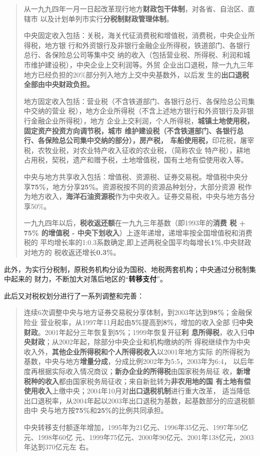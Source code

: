 \begin{quotation}
  从一九九四年一月一日起改革现行地方\textbf{财政包干体制}，对各省、自治区、直辖市
  以及计划单列市实行\textbf{分税制财政管理体制}。

  中央固定收入包括：关税，海关代征消费税和增值税，消费税，中央企业所得税，地方银
  行和外资银行及非银行金融企业所得税，铁道部门、各银行总行、各保险总公司等集中交
  纳的收入（包括营业税、所得税、利润和城市维护建设税），中央企业上交利润等。外贸
  企业出口退税，除一九九三年地方已经负担的20\%部分列入地方上交中央基数外，以后发
  生的\textbf{出口退税全部由中央财政负担。}

  地方固定收入包括：营业税（不含铁道部门、各银行总行、各保险总公司集中交纳的营业
  税），地方企业所得税（不含上述地方银行和外资银行及非银行金融企业所得税），地方
  企业上交利润，个人所得税，\textbf{城镇土地使用税，固定资产投资方向调节税，城市
    维护建设税（不含铁道部门、各银行总行、各保险总公司集中交纳的部分），房产税，
    车船使用税，}印花税，屠宰税，农牧业税，对农业特产收入征收的农业税，（简称农业
  特产税），耕地占用税，契税，遗产和赠予税，土地增值税，国有土地有偿使用收入等。

  中央与地方共享收入包括：增值税、资源税、证券交易税。增值税中央分
  享\textbf{75\%}，地方分享\textbf{25\%}。资源税按不同的资源品种划分，大部分资源
  税作为地方收入，\textbf{海洋石油资源税}作为中央收入。证券交易税，中央与地方各分
  享50\%。

  一九九四年以后，\textbf{税收返还额}在一九九三年基数（即1993年的\textbf{消费
    税 + 75\% 的增值税 - 中央下划收入}）上逐年递增，递增率按全国增值税和消费税的
  平均增长率的1:0.3系数确定,即上述两税全国平均每增长\textbf{1\%},中央财政对地方的
  税收返还增长\textbf{0.3\%}。
\end{quotation}

此外，为实行分税制，原税务机构分设为国税、地税两套机构；中央通过分税制集中起来的
财力，不断加大对落后地区的“\textbf{转移支付}”。

此后又对税权划分进行了一系列调整和完善：
\begin{quotation}
  连续6次调整中央与地方证券交易税分享体制，到2003年达到\textbf{98\%}；金融保险业
  营业税率，从1997年11月起由\textbf{5\%}提高到\textbf{8\%}，增加的收入全部
  归\textbf{中央财政}。2001年起分三年恢复到\textbf{5\%}；1999年恢复开征\textbf{利
    息所得税}，收入归\textbf{中央财政}；从2002年起，除部分中央企业和机构缴纳的所
  得税继续作为中央收入外，\textbf{其他企业所得税和个人所得税收入}以2001年地方实际
  的所得税为基数，中央与地方\textbf{增量分成}，分成比例2002年为5:5，2003年为6:4，
  以后年度再根据实际收入情况商议；\textbf{新办企业的所得税}由国家税务局征
  收，\textbf{新增税种的收入}都由国家税务局征收；来自新批转为\textbf{非农用地的国
    有土地有偿使用收入}上缴中央；2004年10月对\textbf{出口退税机制}进行重大改革，
  适当降低出口退税率，从2004年起以2003年出口退税为基数，起基数部分的应退税额由中
  央与地方按\textbf{75\%}和\textbf{25\%}的比例共同承担。

  中央转移支付额逐年增加，1995年为21亿元、1996年35亿元、1997年50亿元、1998年60亿
  元、1999年75亿元、2000年90亿元、2001年138亿元，2003年达到370亿元左
  右。\cite{eryuancaizheng}
\end{quotation}

